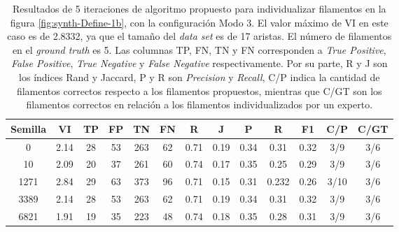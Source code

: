 \begin{table}[h]
    \centering
    \begin{tabular}{|c|c|c|c|c|c|c|c|c|c|c|c|c|}
    \hline
        Semilla & VI & TP & FP &TN &FN & R	& J & P & R &F1 & C/P & C/GT \\ \hline 
        0  & 2.14 & 28 & 53 & 263 & 62 & 0.71 & 0.19 & 0.34 & 0.31 & 0.32 & 3/9 & 3/6\\
        10 & 2.09 & 20 & 37 & 261 & 60 & 0.74 & 0.17 & 0.35 & 0.25 & 0.29 & 3/9 & 3/6\\
        1271 & 2.84 & 29 & 63 & 373 & 96 & 0.71 & 0.15& 0.31 & 0.232 & 0.26 & 3/10 & 3/6\\
        3389 & 2.14 & 28 & 53 & 263 & 62 & 0.71 & 0.19 & 0.34 & 0.31 & 0.32 & 3/9 & 3/6\\
        6821 & 1.91 & 19 & 35 & 223 & 48 & 0.74 & 0.18 & 0.35 & 0.28 & 0.31 & 3/9 & 3/6\\
        \hline
    \end{tabular}
    \caption[Resultados de 5 iteraciones de algoritmo propuesto para individualizar filamentos en la figura \ref{fig:synth-Define-1b}, con la configuraci\'on Modo 3.]{Resultados de 5 iteraciones de algoritmo propuesto para individualizar filamentos en la figura \ref{fig:synth-Define-1b}, con la configuraci\'on Modo 3. El valor m\'aximo de VI en este caso es de 2.8332, ya que el tama\~no del {\it data set} es de 17 aristas. El n\'umero de filamentos en el {\it ground truth} es 5. Las columnas TP, FN, TN y FN corresponden a {\it True Positive}, {\it  False Positive}, {\it True Negative} y {\it False Negative} respectivamente. Por su parte, R y J son los \'indices Rand y Jaccard, P y R son {\it Precision} y {\it Recall}, C/P indica la cantidad de filamentos correctos respecto a los filamentos propuestos, mientras que C/GT son los filamentos correctos en relaci\'on a los filamentos individualizados por un experto.}
    \label{tab:Synth-Define-1b-DetailedResults1}
\end{table}



